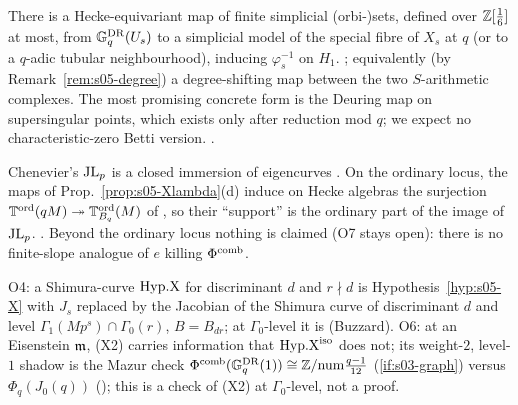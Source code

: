 \begin{conjecture}\label{conj:s05-O2}
There is a Hecke-equivariant map of finite simplicial (orbi-)sets, defined over $\mathbb{Z}[\frac1{6}]$ at most, from $\mathbb{G}^{\mathrm{DR}}_q(U_s)$ to a simplicial
model of the special fibre of $X_s$ at $q$ (or to a $q$-adic tubular neighbourhood), inducing $\varphi_s^{-1}$ on $H_1$. \stconj{};
equivalently (by Remark~\ref{rem:s05-degree}) a degree-shifting map between the two $S$-arithmetic complexes. The most promising concrete
form is the Deuring map on supersingular points, which exists only after reduction mod $q$; we expect no characteristic-zero Betti
version. \stopen.
\end{conjecture}

\begin{remark}\label{rem:s05-O7}
Chenevier's $\mathrm{JL}_p$ is a closed immersion of eigencurves
. On the ordinary locus, the maps of
Prop.~\ref{prop:s05-Xlambda}(d) induce on Hecke algebras the surjection $\mathbb{T}^{\mathrm{ord}}(qM)\twoheadrightarrow\mathbb{T}^{\mathrm{ord}}_{B_q}(M)$ of
, so their ``support'' is the ordinary part of the image of $\mathrm{JL}_p$. \stsketch. Beyond the ordinary locus nothing
is claimed (O7 stays open): there is no finite-slope analogue of $e$ killing $\Phi^{\mathrm{comb}}$.
\end{remark}

\begin{remark}\label{rem:s05-O46}
O4: a Shimura-curve $\mathrm{Hyp.X}$ for discriminant $d$ and $r\nmid d$ is Hypothesis~\ref{hyp:s05-X} with $J_s$ replaced by the Jacobian of the
Shimura curve of discriminant $d$ and level $\Gamma_1(Mp^s)\cap\Gamma_0(r)$, $B=B_{dr}$; at $\Gamma_0$-level it is
 (Buzzard). O6: at an Eisenstein $\mathfrak{m}$, (X2) carries
information that $\mathrm{Hyp.X}^{\mathrm{iso}}$ does not; its weight-$2$, level-$1$ shadow is the Mazur check $\Phi^{\mathrm{comb}}(\mathbb{G}^{\mathrm{DR}}_q(1))\cong\mathbb{Z}/\mathrm{num}\frac{q-1}{12}$
(\ref{if:s03-graph}) versus $\Phi_q(J_0(q))$ (); this is a check of (X2) at $\Gamma_0$-level, not a proof.
\end{remark}
